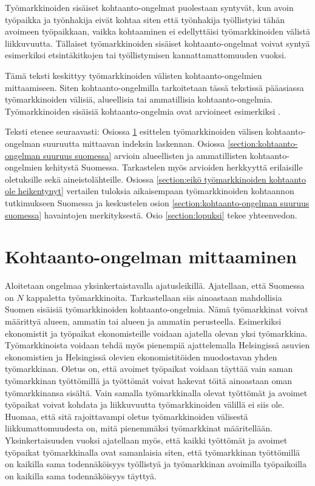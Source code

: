\documentclass[12pt]{article}
\begin{document}
Työmarkkinoiden sisäiset kohtaanto-ongelmat puolestaan syntyvät, kun avoin työpaikka ja työnhakija eivät kohtaa siten että työnhakija työllistyisi tähän avoimeen työpaikkaan, vaikka kohtaaminen ei edellyttäisi työmarkkinoiden välistä liikkuvuutta. Tällaiset työmarkkinoiden sisäiset kohtaanto-ongelmat voivat syntyä esimerkiksi etsintäkitkojen tai työllistymisen kannattamattomuuden vuoksi. 

Tämä teksti keskittyy työmarkkinoiden välisten kohtaanto-ongelmien mittaamiseen. Siten kohtaanto-ongelmilla tarkoitetaan tässä tekstissä pääasiassa työmarkkinoiden välisiä, alueellisia tai ammatillisia kohtaanto-ongelmia. Työmarkkinoiden sisäisiä kohtaanto-ongelmia ovat arvioineet esimerkiksi . 

Teksti etenee seuraavasti: Osiossa \ref{section:kohtaanto-ongelman mittaaminen} esittelen työmarkkinoiden välisen kohtaanto-ongelman suuruutta mittaavan indeksin laskennan. Osiossa \ref{section:kohtaanto-ongelman suuruus suomessa} arvioin alueellisten ja ammatillisten kohtaanto-ongelmien kehitystä Suomessa. Tarkastelen myös arvioiden herkkyyttä erilaisille oletuksille sekä aineistolähteille. Osiossa \ref{section:eikö työmarkkinoiden kohtaanto ole heikentynyt} vertailen tuloksia aikaisempaan työmarkkinoiden kohtaannon tutkimukseen Suomessa ja keskustelen osion \ref{section:kohtaanto-ongelman suuruus suomessa} havaintojen merkityksestä. Osio \ref{section:lopuksi} tekee yhteenvedon.

\section{Kohtaanto-ongelman mittaaminen} \label{section:kohtaanto-ongelman mittaaminen}

Aloitetaan ongelmaa yksinkertaistavalla ajatusleikillä. Ajatellaan, että Suomessa on $N$ kappaletta työmarkkinoita. Tarkastellaan siis ainoastaan mahdollisia Suomen sisäisiä työmarkkinoiden kohtaanto-ongelmia. Nämä työmarkkinat voivat määrittyä alueen, ammatin tai alueen ja ammatin perusteella. Esimerkiksi ekonomistit ja työpaikat ekonomisteille voidaan ajatella olevan yksi työmarkkina. Työmarkkinoista voidaan tehdä myös pienempiä ajattelemalla Helsingissä asuvien ekonomistien ja Helsingissä olevien ekonomistitöiden muodostavan yhden työmarkkinan. Oletus on, että avoimet työpaikat voidaan täyttää vain saman työmarkkinan työttömillä ja työttömät voivat hakevat töitä ainoastaan oman työmarkkinansa sisältä. Vain samalla työmarkkinalla olevat työttömät ja avoimet työpaikat voivat kohdata ja liikkuvuutta työmarkkinoiden välillä ei siis ole. Huomaa, että sitä rajoittavampi oletus työmarkkinoiden välisestä liikkumattomuudesta on, mitä pienemmäksi työmarkkinat määritellään. Yksinkertaisuuden vuoksi ajatellaan myös, että kaikki työttömät ja avoimet työpaikat työmarkkinalla ovat samanlaisia siten, että työmarkkinan työttömillä on kaikilla sama todennäköisyys työllistyä ja työmarkkinan avoimilla työpaikoilla on kaikilla sama todennäköisyys täyttyä.
\end{document}
